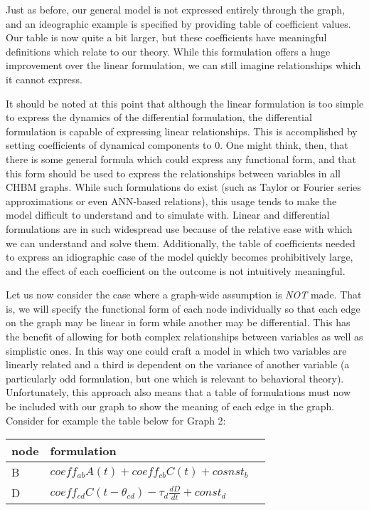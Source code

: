\documentclass[runningheads,a4paper]{llncs}
\begin{document}
Just as before, our general model is not expressed entirely through the graph, and an  ideographic example is specified by providing table of coefficient values.
Our table is now quite a bit larger, but these coefficients have meaningful definitions which relate to our theory.
While this formulation offers a huge improvement over the linear formulation, we can still imagine relationships which it cannot express.

It should be noted at this point that although the linear formulation is too simple to express the dynamics of the differential formulation, the differential formulation is capable of expressing linear relationships.
This is accomplished by setting coefficients of dynamical components to 0.
One might think, then, that there is some general formula which could express any functional form, and that this form should be used to express the relationships between variables in all CHBM graphs.
While such formulations do exist (such as Taylor or Fourier series approximations or even ANN-based relations), this usage tends to make the model difficult to understand and to simulate with.
Linear and differential formulations are in such widespread use because of the relative ease with which we can understand and solve them. 
Additionally, the table of coefficients needed to express an idiographic case of the model quickly becomes prohibitively large, and the effect of each coefficient on the outcome is not intuitively meaningful.

Let us now consider the case where a graph-wide assumption is \emph{NOT} made.
That is, we will specify the functional form of each node individually so that each edge on the graph may be linear in form while another may be differential.
This has the benefit of allowing for both complex relationships between variables as well as simplistic ones.
In this way one could craft a model in which two variables are linearly related and a third is dependent on the variance of another variable (a particularly odd formulation, but one which is relevant to behavioral theory).
Unfortunately, this approach also means that a table of formulations must now be included with our graph to show the meaning of each edge in the graph.
Consider for example the table below for Graph 2:

\begin{centering}
  \begin{tabular}{ | l | l | l |}
      \hline
      node & formulation \\ \hline
      B & $coeff_{ab}A(t) + coeff_{cb}C(t) + cosnst_b$  \\ \hline
      D & $coeff_{cd}C(t-\theta_{cd}) - \tau_{d}\frac{dD}{dt} + const_d$ \\ \hline
  \end{tabular}
\end{centering}
\end{document}
